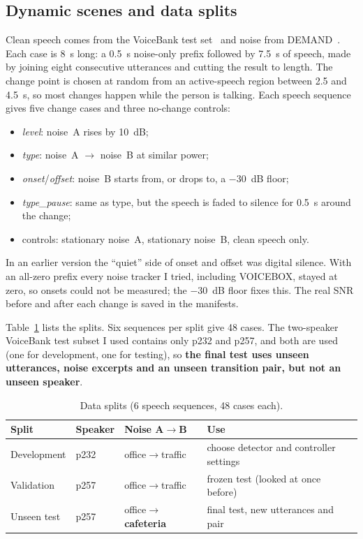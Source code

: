 \documentclass[10pt,conference,a4paper]{IEEEtran}
\begin{document}
\subsection{Dynamic scenes and data splits}
Clean speech comes from the VoiceBank test set~\cite{valentini2017voicebank} and
noise from DEMAND~\cite{thiemann2013demand}. Each case is 8~s long: a 0.5~s
noise-only prefix followed by 7.5~s of speech, made by joining eight consecutive
utterances and cutting the result to length. The change point is
chosen at random from an active-speech region between 2.5 and 4.5~s, so most
changes happen while the person is talking. Each speech sequence gives five
change cases and three no-change controls:
\begin{itemize}
\item \emph{level}: noise~A rises by 10~dB;
\item \emph{type}: noise~A $\to$ noise~B at similar power;
\item \emph{onset}/\emph{offset}: noise~B starts from, or drops to, a $-30$~dB floor;
\item \emph{type\_pause}: same as type, but the speech is faded to silence for 0.5~s around the change;
\item controls: stationary noise~A, stationary noise~B, clean speech only.
\end{itemize}
In an earlier version the ``quiet'' side of onset and offset was digital
silence. With an all-zero prefix every noise tracker I tried, including VOICEBOX,
stayed at zero, so onsets could not be measured; the $-30$~dB floor fixes this.
The real SNR before and after each change is saved in the manifests.

Table~\ref{tab:splits} lists the splits. Six sequences per split give 48 cases.
The two-speaker VoiceBank test subset I used contains only p232 and p257, and
both are used (one for development, one for testing), so \textbf{the final test
uses unseen utterances, noise excerpts and an unseen transition pair, but not an
unseen speaker}.

\begin{table}[t]
\centering
\caption{Data splits (6 speech sequences, 48 cases each).}
\label{tab:splits}
\footnotesize
\begin{tabular}{@{}lllp{2.4cm}@{}}
\toprule
Split & Speaker & Noise A$\to$B & Use\\
\midrule
Development & p232 & office$\to$traffic & choose detector and controller settings\\
Validation & p257 & office$\to$traffic & frozen test (looked at once before)\\
Unseen test & p257 & office$\to$\textbf{cafeteria} & final test, new utterances and pair\\
\bottomrule
\end{tabular}
\end{table}
\end{document}

